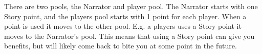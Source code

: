 




There are two pools, the Narrator and player pool. 
The Narrator starts with one Story point, and the players pool starts with 1 point for each player.
When a point is used it moves to the other pool. E.g. a players uses a Story point it moves to the Narrator's pool.
This means that using a Story point can give you benefits, but will likely come back to bite you at some point in the future.
  
